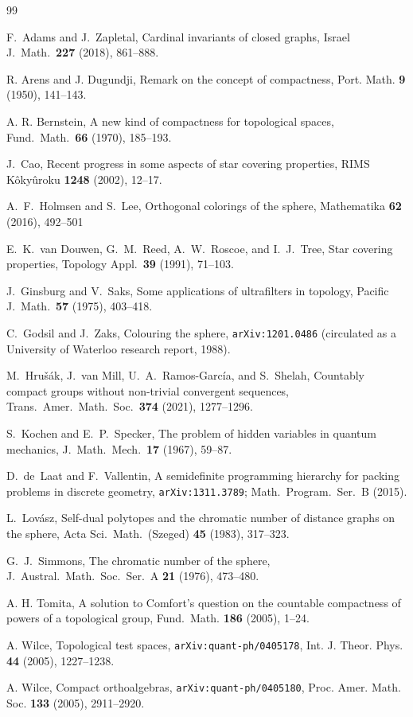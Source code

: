 \documentclass[12pt]{article}
\theoremstyle{plain}
\theoremstyle{definition}
\theoremstyle{remark}
\newcommand{\blue}{\color{blue}}
\begin{document}
\begin{thebibliography}{99}

 F.~Adams and J.~Zapletal, Cardinal invariants of closed graphs, Israel J.\ Math.\ {\bf 227} (2018), 861--888.

 R. Arens and J. Dugundji, Remark on the concept of compactness, Port. Math. {\bf 9} (1950), 141--143.

 A. R. Bernstein, A new kind of compactness for topological spaces, {\blue Fund.\ Math.}\ {\bf 66} (1970), 185--193.

 J.~Cao, Recent progress in some aspects of star covering properties, RIMS K\^oky\^uroku {\bf 1248} (2002), 12--17.


 A.~F.~Holmsen and S.~Lee, Orthogonal colorings of the sphere, Mathematika {\bf 62} (2016), 
{\blue 492--501}

 E.~K.~van Douwen, G.~M.~Reed, A.~W.~Roscoe, and I.~J.~Tree, Star covering properties, Topology Appl.\ {\bf 39} (1991), 71--103.

 J.~Ginsburg and V.~Saks, Some applications of ultrafilters in topology, Pacific J.\ Math.\ {\bf 57} (1975), 403--418.

 C.~Godsil and J.~Zaks, Colouring the sphere, {\tt arXiv:1201.0486} (circulated as a University of Waterloo research report, 1988).

 M.~Hru\v{s}\'ak, J.~van Mill, U.~A.~Ramos-Garc\'ia, and S.~Shelah, Countably compact groups without non-trivial convergent sequences, Trans.\ Amer.\ Math.\ Soc.\ {\bf 374} (2021), 1277--1296.


 S.~Kochen and E.~P.~Specker, The problem of hidden variables in quantum mechanics, J.\ Math.\ Mech.\ {\bf 17} (1967), 59--87.

 D.~de~Laat and F.~Vallentin, A semidefinite programming hierarchy for packing problems in discrete geometry, {\tt arXiv:1311.3789}; Math.\ Program.\ Ser.\ B (2015).

 L.~Lov\'asz, Self-dual polytopes and the chromatic number of distance graphs on the sphere, Acta Sci.\ Math.\ (Szeged) {\bf 45} (1983), 317--323.

 G.~J.~Simmons, The chromatic number of the sphere, J.\ Austral.\ Math.\ Soc.\ Ser.\ A {\bf 21} (1976), 473--480.

 A. H. Tomita, A solution to Comfort's question on the countable compactness of powers of a
topological group, Fund.\ Math. {\bf 186} (2005), 1--24.


 A. Wilce, Topological test spaces, {\tt arXiv:quant-ph/0405178}, Int. J. Theor. Phys. 
{\bf 44} (2005), 1227--1238.

 A. Wilce, Compact orthoalgebras,
{\tt arXiv:quant-ph/0405180}, Proc. Amer. Math. Soc. {\bf 133} (2005), 2911--2920.

\end{thebibliography}
\end{document}
